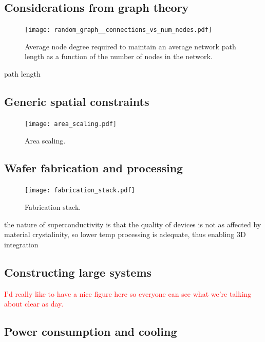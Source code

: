 \documentclass[twocolumn]{article}
\begin{document}
\subsection{Considerations from graph theory}

\begin{figure}
    \centering
    \texttt{[image: random\_graph\_\_connections\_vs\_num\_nodes.pdf]}
    \caption{Average node degree required to maintain an average network path length as a function of the number of nodes in the network.}
    \label{fig:degree_vs_num_nodes}
\end{figure}

path length \cite{frfr2004}

\subsection{Generic spatial constraints}

\begin{figure}
    \centering
    \texttt{[image: area\_scaling.pdf]}
    \caption{Area scaling.}
    \label{fig:area_scaling}
\end{figure}


\subsection{Wafer fabrication and processing}

\begin{figure}
    \centering
    \texttt{[image: fabrication\_stack.pdf]}
    \caption{Fabrication stack.}
    \label{fig:fabrication_stack}
\end{figure}

the nature of superconductivity is that the quality of devices is not as affected by material crystalinity, so lower temp processing is adequate, thus enabling 3D integration

\subsection{Constructing large systems}

\textcolor{Red}{I'd really like to have a nice figure here so everyone can see what we're talking about clear as day.}

\subsection{Power consumption and cooling}
\end{document}
